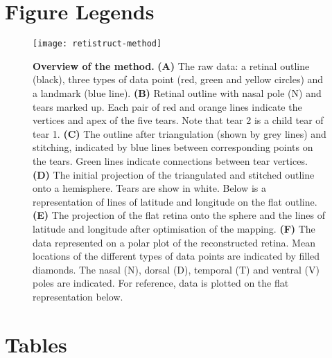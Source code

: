 \documentclass[10pt]{article}
\begin{document}
\section*{Figure Legends}

\begin{figure}[!ht]
  \texttt{[image: retistruct-method]}
  
  \vspace*{-4.54in}

  \mbox{}

  \vspace*{2.27in}

  \caption{\textbf{Overview of the method.} \textbf{(A)} The raw data:
    a retinal outline (black), three types of data point (red, green
    and yellow circles) and a landmark (blue line). \textbf{(B)}
    Retinal outline with nasal pole (N) and tears marked up. Each
    pair of red and orange lines indicate the vertices and apex of the
    five tears. Note that tear 2 is a child tear of tear 1. \textbf{(C)}
    The outline after triangulation (shown by grey lines) and
    stitching, indicated by blue lines between corresponding points
    on the tears. Green lines indicate connections between tear
    vertices.  \textbf{(D)} The initial projection of the triangulated
    and stitched outline onto a hemisphere. Tears are show in
    white. Below is a representation of lines of latitude and
    longitude on the flat outline. \textbf{(E)} The projection of the
    flat retina onto the sphere and the lines of latitude and
    longitude after optimisation of the mapping. \textbf{(F)} The data
    represented on a polar plot of the reconstructed retina. Mean
    locations of the different types of data points are indicated by
    filled diamonds. The nasal (N), dorsal (D), temporal (T) and
    ventral (V) poles are indicated. For reference, data is plotted on
    the flat representation below. }
  \label{fold-sphere:fig:method}
\end{figure}



\section*{Tables}
\end{document}
